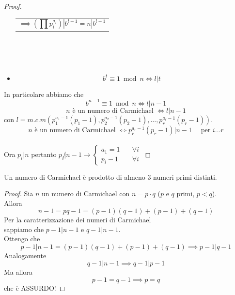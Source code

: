 \documentclass[a4paper,12pt, oneside]{book}
\begin{document}
\begin{proof}
\begin{itemize}
\begin{minipage}{0.45\textwidth}
\begin{tabular}{|p{\textwidth}}
				      $$\implies (\prod p_{i}^{a_i}) | b^{l-1} = n| b^{l-1}$$ \\
			      \end{tabular}
		      \end{minipage}\\\\\\%

		\item $$b^t \equiv 1 \bmod n \iff l|t$$
	\end{itemize}
	In particolare abbiamo che
	$$b^{n-1} \equiv 1 \bmod n \iff l|n-1$$
	$$n \mbox{ è un numero di Carmichael } \iff l|n-1$$
	con $l=m.c.m( p_{1}^{a_{1}-1}(p_{1}-1), p_{2}^{a_{2}-1}(p_{2}-1), \dots, p_{r}^{a_{r}-1}(p_{r}-1) )$.
	$$n \mbox{ è un numero di Carmichael } \iff p_{r}^{a_{r}-1}(p_{r}-1)|n-1 \quad \mbox{ per } i \dots r$$\\
	Ora $p_i|n$ pertanto $p_i \not | n-1 \rightarrow \begin{cases}
			a_1 = 1 & \quad \forall i \\
			p_i -1  & \quad \forall i
		\end{cases}$

\end{proof}

\begin{corollario}
	Un numero di Carmichael è prodotto di almeno 3 numeri primi distinti.
	\begin{proof}
		Sia $n$ un numero di Carmichael con $n=p \cdot q$ ($p$ e $q$ primi, $p<q$).\\
		Allora
		$$n-1 = pq-1 = (p-1)(q-1) + (p-1) + (q-1)$$
		Per la caratterizzazione dei numeri di Carmichael\\ sappiamo che $p-1|n-1$ e $q-1|n-1$.\\
		Ottengo che
		$$p-1|n-1=(p-1)(q-1) + (p-1) +(q-1) \implies p-1|q-1$$
		Analogamente
		$$q-1|n-1 \implies q-1|p-1$$
		Ma allora
		$$p-1=q-1 \implies p=q$$
		che è ASSURDO!
	\end{proof}
\end{corollario}
\end{document}
